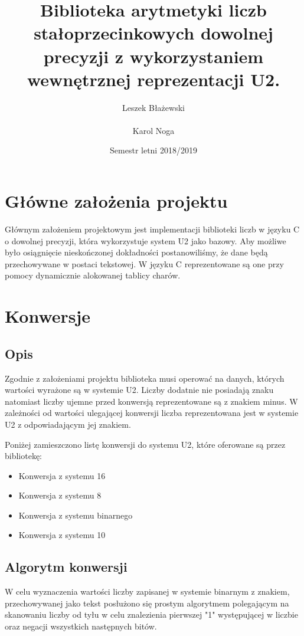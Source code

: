\documentclass{article}
\title{Biblioteka arytmetyki liczb stałoprzecinkowych dowolnej precyzji z wykorzystaniem wewnętrznej reprezentacji U2.}
\author{Leszek Błażewski \\ \\Karol Noga}
\date{Semestr letni 2018/2019}
\begin{document}
\maketitle
\clearpage
\section{Główne założenia projektu}
Głównym założeniem projektowym jest implementacji biblioteki liczb w języku C o dowolnej precyzji, która wykorzystuje system U2 jako bazowy. Aby możliwe było osiągnięcie nieskończonej dokładności postanowiliśmy, że dane będą przechowywane w postaci tekstowej. W języku C reprezentowane są one przy pomocy dynamicznie alokowanej tablicy charów.

\section{Konwersje}
\subsection{Opis}
Zgodnie z założeniami projektu biblioteka musi operować na danych, których wartości wyrażone są w systemie U2. Liczby dodatnie nie posiadają znaku natomiast liczby ujemne przed konwersją reprezentowane są z znakiem minus.
W zależności od wartości ulegającej konwersji liczba reprezentowana jest w systemie U2 z odpowiadającym jej znakiem.

\vspace{5mm} %

Poniżej zamieszczono listę konwersji do systemu U2, które oferowane są przez bibliotekę:
\begin{itemize}
    \item Konwersja z systemu 16
    \item Konwersja z systemu 8
    \item Konwersja z systemu binarnego
    \item Konwersja z systemu 10
\end{itemize}

\subsection{Algorytm konwersji}
W celu wyznaczenia wartości liczby zapisanej w systemie binarnym z znakiem, przechowywanej jako tekst posłużono się prostym algorytmem polegającym na skanowaniu liczby od tyłu w celu znalezienia pierwszej "1" występującej w liczbie oraz negacji wszystkich następnych bitów.
\end{document}
